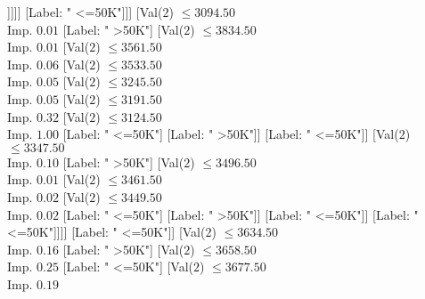 \documentclass[margin=10pt]{standalone}
\begin{document}
\begin{forest}
																																						[Val($2$) $ \leq 2886.50$ \\ Imp. $0.46$
																																							[Label: " <=50K"]
																																							[Label: " >50K"]]]]]
																																			[Label: " <=50K"]]]
																																	[Val($2$) $ \leq 3094.50$ \\ Imp. $0.01$
																																		[Label: " >50K"]
																																		[Val($2$) $ \leq 3834.50$ \\ Imp. $0.01$
																																			[Val($2$) $ \leq 3561.50$ \\ Imp. $0.06$
																																				[Val($2$) $ \leq 3533.50$ \\ Imp. $0.05$
																																					[Val($2$) $ \leq 3245.50$ \\ Imp. $0.05$
																																						[Val($2$) $ \leq 3191.50$ \\ Imp. $0.32$
																																							[Val($2$) $ \leq 3124.50$ \\ Imp. $1.00$
																																								[Label: " <=50K"]
																																								[Label: " >50K"]]
																																							[Label: " <=50K"]]
																																						[Val($2$) $ \leq 3347.50$ \\ Imp. $0.10$
																																							[Label: " >50K"]
																																							[Val($2$) $ \leq 3496.50$ \\ Imp. $0.01$
																																								[Val($2$) $ \leq 3461.50$ \\ Imp. $0.02$
																																									[Val($2$) $ \leq 3449.50$ \\ Imp. $0.02$
																																										[Label: " <=50K"]
																																										[Label: " >50K"]]
																																									[Label: " <=50K"]]
																																								[Label: " <=50K"]]]]
																																					[Label: " <=50K"]]
																																				[Val($2$) $ \leq 3634.50$ \\ Imp. $0.16$
																																					[Label: " >50K"]
																																					[Val($2$) $ \leq 3658.50$ \\ Imp. $0.25$
																																						[Label: " <=50K"]
																																						[Val($2$) $ \leq 3677.50$ \\ Imp. $0.19$

\end{forest}
\end{document}
